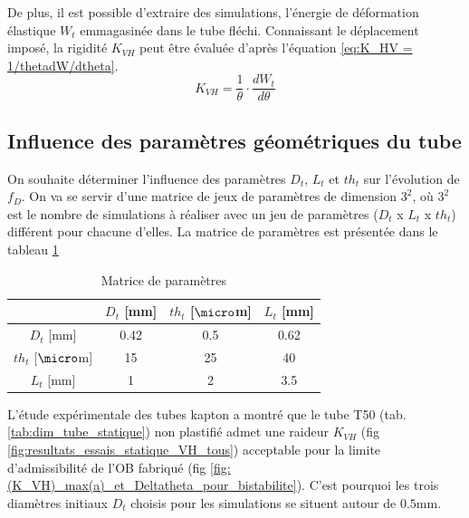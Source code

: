 De plus, il est possible d'extraire des simulations, l'énergie de déformation élastique $W_t$ emmagasinée dans le tube fléchi. Connaissant le déplacement imposé, la rigidité $K_{VH}$ peut être évaluée d'après l'équation \ref{eq:K_HV = 1/thetadW/dtheta}.
\begin{equation}
 	K_{VH} = \frac{1}{\theta} \cdot \frac{dW_t}{d\theta}
 	\label{eq:K_HV = 1/thetadW/dtheta}
\end{equation}   
    	\subsection{Influence des paramètres géométriques du tube}
    	\label{sec:5.2.2 - Impact des parametres geometriques du tube}
On souhaite déterminer l'influence des paramètres $D_t$, $L_t$ et $th_t$ sur l'évolution de $f_D$. On va se servir d'une matrice de jeux de paramètres de dimension $3^2$, où $3^2$ est le nombre de simulations à réaliser avec un jeu de paramètres ($D_t$ x $L_t$ x $th_t$) différent pour chacune d'elles. La matrice de paramètres est présentée dans le tableau \ref{tab:jeux de parametres de simulations EF}
\begin{table}[!htbp]
	\centering
		\begin{tabular}[t]{|c|c|c|c|}
\cline{2-4}
\multicolumn{1}{c|}{}	&
$D_t$ [mm]				&
$th_t$ [$\micro$m]		& 
$L_t$ [mm] \\
\cline{2-4} \hline
$D_t$ [mm]			& 0.42 & 0.5 & 0.62 	\\
\hline
$th_t$ [$\micro$m]	& 15   & 25   & 40  	\\
\hline
$L_t$ [mm]    	    & 1    &2     & 3.5		\\
\hline
		\end{tabular}
        \caption{Matrice de paramètres}
        \label{tab:jeux de parametres de simulations EF}
\end{table}        

L'étude expérimentale des tubes kapton a montré que le tube T50 (tab. \ref{tab:dim_tube_statique}) non plastifié admet une raideur $K_{VH}$ (fig \ref{fig:resultats_essais_statique_VH_tous}) acceptable pour la limite d'admissibilité de l'OB fabriqué (fig \ref{fig:(K_VH)_max(a)_et_Deltatheta_pour_bistabilite}). C'est pourquoi les trois diamètres initiaux $D_t$ choisis pour les simulations se situent autour de $0.5$mm.
